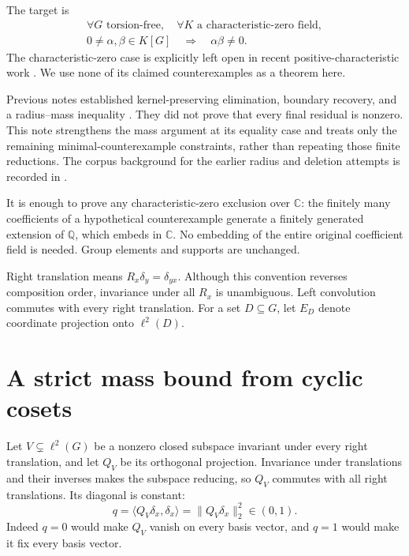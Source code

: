 \documentclass[11pt,a4paper,oneside]{report}
\theoremstyle{definition}
\theoremstyle{remark}
\newcommand{\C}{\mathbb C}
\newcommand{\Q}{\mathbb Q}
\begin{document}
The target is
\begin{equation}\label{M08:eq:target}
\begin{gathered}
\forall G\text{ torsion-free},\quad\forall K\text{ a characteristic-zero field},\\
0\ne\alpha,\beta\in K[G]\quad\Longrightarrow\quad\alpha\beta\ne0.
\end{gathered}
\end{equation}
The characteristic-zero case is explicitly left open in recent
positive-characteristic work \cite{B:Ivanov}. We use none of its claimed
counterexamples as a theorem here.

Previous notes established kernel-preserving elimination, boundary
recovery, and a radius--mass inequality \cite{B:InternalRadiusResidual}. They did not
prove that every final residual is nonzero. This note strengthens the
mass argument at its equality case and treats only the remaining
minimal-counterexample constraints, rather than repeating those
finite reductions. The corpus background for the earlier radius and
deletion attempts is recorded in \cite{B:Corpus}.

It is enough to prove any characteristic-zero exclusion over $\C$:
the finitely many coefficients of a hypothetical counterexample
generate a finitely generated extension of $\Q$, which embeds in
$\C$. No embedding of the entire original coefficient field is needed.
Group elements and supports are unchanged.

Right translation means $R_x\delta_y=\delta_{yx}$. Although this
convention reverses composition order, invariance under all $R_x$
is unambiguous. Left convolution commutes with every right translation.
For a set $D\subseteq G$, let $E_D$ denote coordinate projection onto
$\ell^2(D)$.

\section{A strict mass bound from cyclic cosets}\label{M08:sec:strict}

Let $V\subsetneq\ell^2(G)$ be a nonzero closed subspace invariant
under every right translation, and let $Q_V$ be its orthogonal
projection. Invariance under translations and their inverses makes
the subspace reducing, so $Q_V$ commutes with all right translations.
Its diagonal is constant:
\[
q=\langle Q_V\delta_x,\delta_x\rangle
=\|Q_V\delta_x\|_2^2\in(0,1).
\]
Indeed $q=0$ would make $Q_V$ vanish on every basis vector, and
$q=1$ would make it fix every basis vector.
\end{document}
